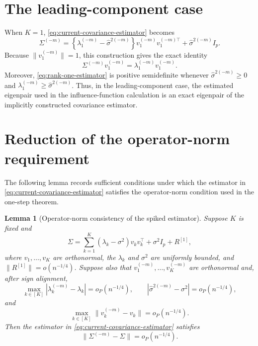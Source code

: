 \documentclass[11pt]{article}
\newtheorem{lemma}{Lemma}
\begin{document}
\section{The leading-component case}

When $K=1$, \eqref{eq:current-covariance-estimator} becomes
\begin{equation}
\Sigma^{(-m)}
=
\left\{\lambda_1^{(-m)}-\widehat\sigma^{2(-m)}\right\}
v_1^{(-m)}v_1^{(-m)\top}
+\widehat\sigma^{2(-m)}I_p.
\label{eq:rank-one-estimator}
\end{equation}
Because $\|v_1^{(-m)}\|=1$, this construction gives the exact identity
\begin{equation}
\Sigma^{(-m)}v_1^{(-m)}
=\lambda_1^{(-m)}v_1^{(-m)}.
\label{eq:estimated-eigenpair}
\end{equation}
Moreover, \eqref{eq:rank-one-estimator} is positive semidefinite whenever
$\widehat\sigma^{2(-m)}\geq0$ and
$\lambda_1^{(-m)}\geq\widehat\sigma^{2(-m)}$.
Thus, in the leading-component case, the estimated eigenpair used in the
influence-function calculation is an exact eigenpair of the implicitly
constructed covariance estimator.

\section{Reduction of the operator-norm requirement}

The following lemma records sufficient conditions under which the estimator
in \eqref{eq:current-covariance-estimator} satisfies the operator-norm
condition used in the one-step theorem.

\begin{lemma}[Operator-norm consistency of the spiked estimator]
\label{lem:spiked-covariance-rate}
Suppose $K$ is fixed and
\begin{equation}
\Sigma
=
\sum_{k=1}^K(\lambda_k-\sigma^2)v_kv_k^\top
+\sigma^2I_p+R^{[1]},
\label{eq:population-spiked-decomposition}
\end{equation}
where $v_1,\ldots,v_K$ are orthonormal, the $\lambda_k$ and $\sigma^2$ are
uniformly bounded, and $\|R^{[1]}\|=o(n^{-1/4})$. Suppose also that
$v_1^{(-m)},\ldots,v_K^{(-m)}$ are orthonormal and, after sign alignment,
\begin{equation*}
\max_{k\in[K]}|\lambda_k^{(-m)}-\lambda_k|=o_P(n^{-1/4}),
\qquad
|\widehat\sigma^{2(-m)}-\sigma^2|=o_P(n^{-1/4}),
\end{equation*}
and
\begin{equation*}
\max_{k\in[K]}\|v_k^{(-m)}-v_k\|=o_P(n^{-1/4}).
\end{equation*}
Then the estimator in \eqref{eq:current-covariance-estimator} satisfies
\begin{equation*}
\|\Sigma^{(-m)}-\Sigma\|=o_P(n^{-1/4}).
\end{equation*}
\end{lemma}
\end{document}
